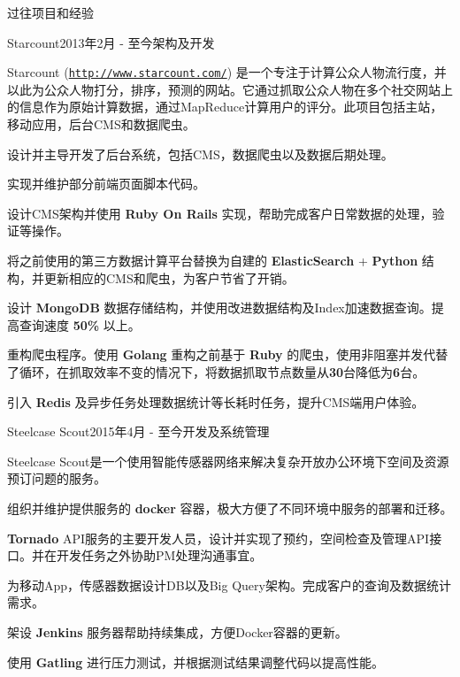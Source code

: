 \documentclass{resume} %
\newcommand{\http}{http:/\hspace{-0.3ex}/}
\newcommand{\kaiti}{\CJKfamily{kaiti}}
\begin{document}
\begin{rSection}{\kaiti 过往项目和经验}

\begin{rSubsection}{Starcount}{2013年2月 - 至今}{架构及开发}{}

Starcount (\href{http://www.starcount.com/}{\tt \http{}www.starcount.com/}) 是一个专注于计算公众人物流行度，并以此为公众人物打分，排序，预测的网站。它通过抓取公众人物在多个社交网站上的信息作为原始计算数据，通过MapReduce计算用户的评分。此项目包括主站，移动应用，后台CMS和数据爬虫。

\begin{rSubsectionList}
\item 设计并主导开发了后台系统，包括CMS，数据爬虫以及数据后期处理。
\item 实现并维护部分前端页面脚本代码。
\item 设计CMS架构并使用 \textbf{Ruby On Rails} 实现，帮助完成客户日常数据的处理，验证等操作。
\item 将之前使用的第三方数据计算平台替换为自建的 \textbf{ElasticSearch} + \textbf{Python} 结构，并更新相应的CMS和爬虫，为客户节省了开销。
\item 设计 \textbf{MongoDB} 数据存储结构，并使用改进数据结构及Index加速数据查询。提高查询速度 \textbf{50\%} 以上。
\item 重构爬虫程序。使用 \textbf{Golang} 重构之前基于 \textbf{Ruby} 的爬虫，使用非阻塞并发代替了循环，在抓取效率不变的情况下，将数据抓取节点数量从\textbf{30}台降低为\textbf{6}台。
\item 引入 \textbf{Redis} 及异步任务处理数据统计等长耗时任务，提升CMS端用户体验。
\end{rSubsectionList}
\end{rSubsection}


\begin{rSubsection}{Steelcase Scout}{2015年4月 - 至今}{开发及系统管理}{}

Steelcase Scout是一个使用智能传感器网络来解决复杂开放办公环境下空间及资源预订问题的服务。

\begin{rSubsectionList}
\item 组织并维护提供服务的 \textbf{docker} 容器，极大方便了不同环境中服务的部署和迁移。
\item \textbf{Tornado} API服务的主要开发人员，设计并实现了预约，空间检查及管理API接口。并在开发任务之外协助PM处理沟通事宜。
\item 为移动App，传感器数据设计DB以及Big Query架构。完成客户的查询及数据统计需求。
\item 架设 \textbf{Jenkins} 服务器帮助持续集成，方便Docker容器的更新。
\item 使用 \textbf{Gatling} 进行压力测试，并根据测试结果调整代码以提高性能。
\end{rSubsectionList}
\end{rSubsection}



\end{rSection}
\end{document}
